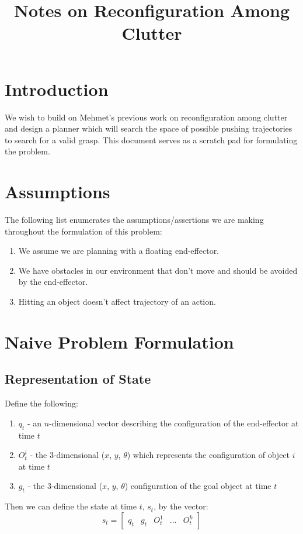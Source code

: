 \documentclass[11pt, oneside]{article}   	%
\title{Notes on Reconfiguration Among Clutter}
\begin{document}
\maketitle

\section*{Introduction}
We wish to build on Mehmet's previous work on reconfiguration among clutter and design a planner which will search the space of possible pushing trajectories to search for a valid grasp.  This document serves  as a scratch pad for formulating the problem.

\section*{Assumptions}
The following list enumerates the assumptions/assertions we are making throughout the formulation of this problem:
\begin{enumerate}
\item We assume we are planning with a floating end-effector.
\item We have obstacles in our environment that don't move and should be avoided by the end-effector.
\item Hitting an object doesn't affect trajectory of an action.
\end{enumerate}

\section*{Naive Problem Formulation}
\subsection*{Representation of State}
Define the following:
\begin{enumerate}
\item $q_t$ - an $n$-dimensional vector describing the configuration of the end-effector at time $t$
\item  $O_t^i$ - the 3-dimensional ($x$, $y$, $\theta$) which represents the configuration of object $i$ at time $t$
\item $g_t$ - the 3-dimensional ($x$, $y$, $\theta$) configuration of the goal object at time $t$
\end{enumerate}
Then we can define the state at time $t$, $s_t$, by the vector:
\[ s_t = \left[\begin{array}{ccccc}
q_t & g_t & O_t^1 & ... & O_t^k
\end{array}
\right] \]
\end{document}

